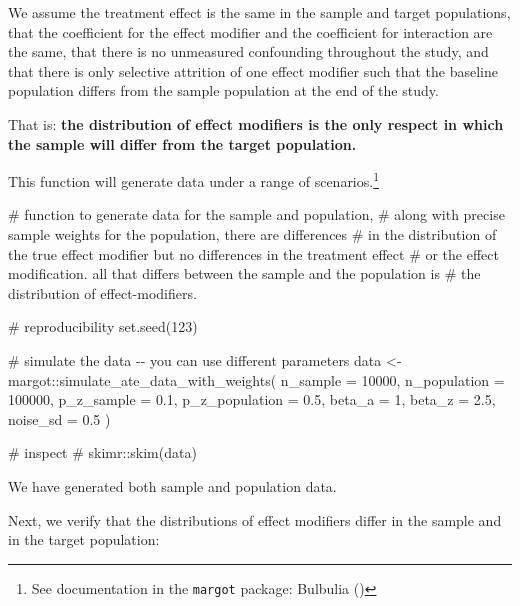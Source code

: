 \documentclass[
  single column]{article}
\newenvironment{Shaded}{\begin{snugshade}}{\end{snugshade}}
\newcommand{\AttributeTok}[1]{\textcolor[rgb]{0.40,0.45,0.13}{#1}}
\newcommand{\CommentTok}[1]{\textcolor[rgb]{0.37,0.37,0.37}{#1}}
\newcommand{\DecValTok}[1]{\textcolor[rgb]{0.68,0.00,0.00}{#1}}
\newcommand{\FloatTok}[1]{\textcolor[rgb]{0.68,0.00,0.00}{#1}}
\newcommand{\FunctionTok}[1]{\textcolor[rgb]{0.28,0.35,0.67}{#1}}
\newcommand{\NormalTok}[1]{\textcolor[rgb]{0.00,0.23,0.31}{#1}}
\newcommand{\OtherTok}[1]{\textcolor[rgb]{0.00,0.23,0.31}{#1}}
\newcommand{\SpecialCharTok}[1]{\textcolor[rgb]{0.37,0.37,0.37}{#1}}
\begin{document}
We assume the treatment effect is the same in the sample and target
populations, that the coefficient for the effect modifier and the
coefficient for interaction are the same, that there is no unmeasured
confounding throughout the study, and that there is only selective
attrition of one effect modifier such that the baseline population
differs from the sample population at the end of the study.

That is: \textbf{the distribution of effect modifiers is the only
respect in which the sample will differ from the target population.}

This function will generate data under a range of scenarios.\footnote{See
  documentation in the \texttt{margot} package: Bulbulia
  ()}

\begin{Shaded}
\begin{Highlighting}[]
\CommentTok{\# function to generate data for the sample and population, }
\CommentTok{\# along with precise sample weights for the population, there are differences }
\CommentTok{\# in the distribution of the true effect modifier but no differences in the treatment effect }
\CommentTok{\# or the effect modification. all that differs between the sample and the population is }
\CommentTok{\# the distribution of effect{-}modifiers.}

\CommentTok{\# reproducibility}
\FunctionTok{set.seed}\NormalTok{(}\DecValTok{123}\NormalTok{)}

\CommentTok{\# simulate the data {-}{-} you can use different parameters}
\NormalTok{data }\OtherTok{\textless{}{-}}\NormalTok{ margot}\SpecialCharTok{::}\FunctionTok{simulate\_ate\_data\_with\_weights}\NormalTok{(}
  \AttributeTok{n\_sample =} \DecValTok{10000}\NormalTok{,}
  \AttributeTok{n\_population =} \DecValTok{100000}\NormalTok{,}
  \AttributeTok{p\_z\_sample =} \FloatTok{0.1}\NormalTok{,}
  \AttributeTok{p\_z\_population =} \FloatTok{0.5}\NormalTok{,}
  \AttributeTok{beta\_a =} \DecValTok{1}\NormalTok{,}
  \AttributeTok{beta\_z =} \FloatTok{2.5}\NormalTok{,}
  \AttributeTok{noise\_sd =} \FloatTok{0.5}
\NormalTok{)}

\CommentTok{\# inspect}
\CommentTok{\# skimr::skim(data)}
\end{Highlighting}
\end{Shaded}

We have generated both sample and population data.

Next, we verify that the distributions of effect modifiers differ in the
sample and in the target population:
\end{document}
